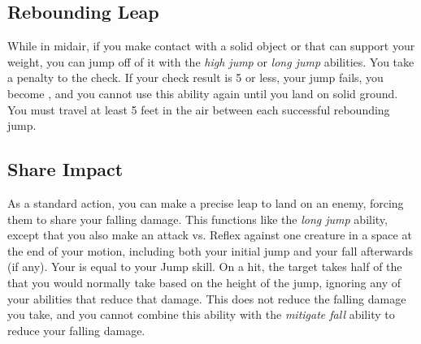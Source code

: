     \subsection{Rebounding Leap}\label{Rebounding Leap}
        While in midair, if you make contact with a solid object or  that can support your weight, you can jump off of it with the \textit{high jump} or \textit{long jump} abilities.
        You take a  penalty to the check.
        If your check result is 5 or less, your jump fails, you become \prone, and you cannot use this ability again until you land on solid ground.
        You must travel at least 5 feet in the air between each successful rebounding jump.

    \subsection{Share Impact}
        As a standard action, you can make a precise leap to land on an enemy, forcing them to share your falling damage.
        This functions like the \textit{long jump} ability, except that you also make an attack vs. Reflex against one creature in a space at the end of your motion, including both your initial jump and your fall afterwards (if any).
        Your  is equal to your Jump skill.
        On a hit, the target takes half of the  that you would normally take based on the height of the jump, ignoring any of your abilities that reduce that damage.
        This does not reduce the falling damage you take, and you cannot combine this ability with the \textit{mitigate fall} ability to reduce your falling damage.

